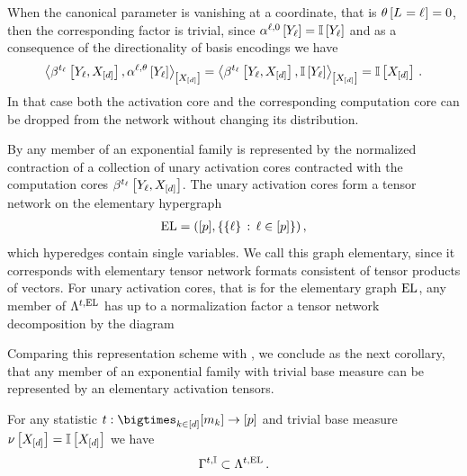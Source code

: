 When the canonical parameter is vanishing at a coordinate, that is $\theta\left[L_{}=\ell_{}\right]=0$, then the corresponding factor is trivial, since $\alpha^{\ell,0}\left[Y_{\ell}\right]=\mathbb{I}\left[Y_{\ell}\right]$ and as a consequence of the directionality of basis encodings we have
\begin{align*}
    \contractionof{\bencodingofat{\sstatcoordinateof{\selindex}}{\headvariableof{\selindex},\shortcatvariables},\softactlegwith}{\shortcatvariables}
    = \contractionof{\bencodingofat{\sstatcoordinateof{\selindex}}{\headvariableof{\selindex},\shortcatvariables},\onesat{\headvariableof{\selindex}}}{\shortcatvariables}
    = \onesat{\shortcatvariables} \, .
\end{align*}
In that case both the activation core and the corresponding computation core can be dropped from the network without changing its distribution.

By  any member of an exponential family is represented by the normalized contraction of a collection of unary activation cores contracted with the computation cores $\bencodingofat{\sstatcoordinateof{\selindex}}{\headvariableof{\selindex},\shortcatvariables}$.
The unary activation cores form a tensor network on the elementary hypergraph
\begin{align*}
    \mathrm{EL}=([p],\{\{\ell\}\,:\,\ell\in[p]\}) \, ,
\end{align*}
which hyperedges contain single variables.
We call this graph elementary, since it corresponds with elementary tensor network formats consistent of tensor products of vectors.
For unary activation cores, that is for the elementary graph $\mathrm{EL}$, any member of $\Lambda^{t,\mathrm{EL}}$ has up to a normalization factor a tensor network decomposition by the diagram
\begin{center}
     
\end{center}
Comparing this representation scheme with , we conclude as the next corollary, that any member of an exponential family with trivial base measure can be represented by an elementary activation tensors.

\begin{corollary}
    \label{cor:unaryActivationExpdistRealization}
    For any statistic $\sstat:\facstates\rightarrow[\seldim]$ and trivial base measure $\nu\left[X_{[d]}\right]=\mathbb{I}\left[X_{[d]}\right]$ we have
    \begin{align*}
        \Gamma^{t,\mathbb{I}} \subset \Lambda^{t,\mathrm{EL}} \, .
    \end{align*}
\end{corollary}

